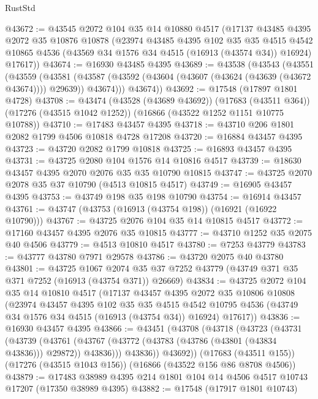 \begin{lexlean}{RustStd}
\begin{coremodule}
@43672 := @43545
    @2072
    @104
    @35
    @14
    @10880
    @4517
    (@17137
      @43485
      @4395
      @2072
      @35
      @10876
      @10878
      (@23974
        @43485
        @4395
        @102
        @35
        @35
        @4515
        @4542
        @10865
        @4536
        (@43569 @34 @1576 @34 @4515 (@16913 (@43574 @34)) @16924)
        @17617))
@43674 := @16930 @43485 @4395
@43689 := @43538
    (@43543
      (@43551
        (@43559
          (@43581
            (@43587 (@43592 (@43604 (@43607 (@43624 (@43639 (@43672 @43674)))) @29639)) @43674)))
        @43674))
@43692 := @17548 (@17897 @1801 @4728)
@43708 := @43474
    (@43528 (@43689 @43692))
    (@17683 (@43511 @364))
    (@17276 (@43515 @1042 @1252))
    (@16866 (@43522 @1252 @1151 @10775 @10788))
@43710 := @17483 @43457 @4395
@43718 := @43710 @206 @1801 @2082 @1799 @4506 @10818 @4728 @17208
@43720 := @16884 @43457 @4395
@43723 := @43720 @2082 @1799 @10818
@43725 := @16893 @43457 @4395
@43731 := @43725 @2080 @104 @1576 @14 @10816 @4517
@43739 := @18630 @43457 @4395 @2070 @2076 @35 @35 @10790 @10815
@43747 := @43725 @2070 @2078 @35 @37 @10790 (@4513 @10815 @4517)
@43749 := @16905 @43457 @4395
@43753 := @43749 @198 @35 @198 @10790
@43754 := @16914 @43457
@43761 := @43747 (@43753 (@16913 (@43754 @198)) (@16921 (@16922 @10790)))
@43767 := @43725 @2076 @104 @35 @14 @10815 @4517
@43772 := @17160 @43457 @4395 @2076 @35 @10815
@43777 := @43710 @1252 @35 @2075 @40 @4506
@43779 := @4513 @10810 @4517
@43780 := @7253 @43779
@43783 := @43777 @43780 @7971 @29578
@43786 := @43720 @2075 @40 @43780
@43801 := @43725
    @1067
    @2074
    @35
    @37
    @7252
    @43779
    (@43749 @371 @35 @371 @7252 (@16913 (@43754 @371)) @26669)
@43834 := @43725
    @2072
    @104
    @35
    @14
    @10810
    @4517
    (@17137
      @43457
      @4395
      @2072
      @35
      @10806
      @10808
      (@23974
        @43457
        @4395
        @102
        @35
        @35
        @4515
        @4542
        @10795
        @4536
        (@43749 @34 @1576 @34 @4515 (@16913 (@43754 @34)) @16924)
        @17617))
@43836 := @16930 @43457 @4395
@43866 := @43451
    (@43708
      (@43718
        (@43723
          (@43731
            (@43739
              (@43761 (@43767 (@43772 (@43783 (@43786 (@43801 (@43834 @43836))) @29872)) @43836)))
            @43836))
        @43692))
    (@17683 (@43511 @155))
    (@17276 (@43515 @1043 @156))
    (@16866 (@43522 @156 @86 @8708 @4506))
@43879 := @17483 @38989 @4395 @214 @1801 @104 @14 @4506 @4517 @10743 @17207 (@17350 @38989 @4395)
@43882 := @17548 (@17917 @1801 @10743)

\end{coremodule}
\end{lexlean}
